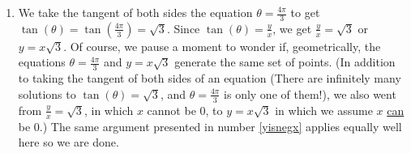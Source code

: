 {\begin{enumerate}
\item  We take the tangent of both sides the equation $\theta = \frac{4\pi}{3}$ to get $\tan(\theta) = \tan\left(\frac{4\pi}{3}\right) = \sqrt{3}$.  Since $\tan(\theta) = \frac{y}{x}$, we get $\frac{y}{x} = \sqrt{3}$ or $y = x\sqrt{3}$.  Of course, we pause a moment to wonder if, geometrically, the equations $\theta = \frac{4\pi}{3}$ and $y = x\sqrt{3}$ generate the same set of points. (In addition to taking the tangent of both sides of an equation (There are infinitely many solutions to $\tan(\theta) = \sqrt{3}$, and $\theta = \frac{4\pi}{3}$ is only one of them!), we also went from $\frac{y}{x} = \sqrt{3}$, in which $x$ cannot be $0$, to $y = x\sqrt{3}$ in which we assume $x$ \underline{can} be $0$.)  The same argument presented in number \ref{yisnegx} applies equally well here so we are done.

\enlargethispage{2\baselineskip}


\end{enumerate}}
